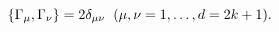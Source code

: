 \begin{equation}
\{\Gamma_{\mu} ,\Gamma_{\nu} \}=2\delta_{\mu\nu}
\hspace{0.2cm}(\mu,\nu=1,\ldots,d=2k+1).
\end{equation}

